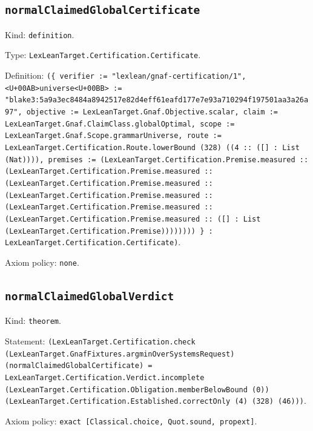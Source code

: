 \documentclass[11pt]{article}
\begin{document}
\subsection*{\texttt{normalClaimedGlobalCertificate}}
\noindent Kind: \texttt{definition}.\par
\noindent Type: \texttt{LexLeanTarget.Certification.Certificate}.\par
\noindent Definition: \texttt{(\{ verifier := "lexlean/gnaf-certification/1", <U+00AB>universe<U+00BB> := "blake3:5a9a3ec8484a8942517e82d4eff61eafd177e7e93a710294f197501aa3a26a97", objective := LexLeanTarget.Gnaf.Objective.scalar, claim := LexLeanTarget.Gnaf.ClaimClass.globalOptimal, scope := LexLeanTarget.Gnaf.Scope.grammarUniverse, route := LexLeanTarget.Certification.Route.lowerBound (328) ((4 :: ([] : List (Nat)))), premises := (LexLeanTarget.Certification.Premise.measured :: (LexLeanTarget.Certification.Premise.measured :: (LexLeanTarget.Certification.Premise.measured :: (LexLeanTarget.Certification.Premise.measured :: (LexLeanTarget.Certification.Premise.measured :: (LexLeanTarget.Certification.Premise.measured :: ([] : List (LexLeanTarget.Certification.Premise)))))))) \} : LexLeanTarget.Certification.Certificate)}.\par
\noindent Axiom policy: \texttt{none}.\par
\subsection*{\texttt{normalClaimedGlobalVerdict}}
\noindent Kind: \texttt{theorem}.\par
\noindent Statement: \texttt{(LexLeanTarget.Certification.check (LexLeanTarget.GnafFixtures.argminOverSystemsRequest) (normalClaimedGlobalCertificate) = LexLeanTarget.Certification.Verdict.incomplete (LexLeanTarget.Certification.Obligation.memberBelowBound (0)) (LexLeanTarget.Certification.Established.correctOnly (4) (328) (46)))}.\par
\noindent Axiom policy: \texttt{exact [Classical.choice, Quot.sound, propext]}.\par
\end{document}
